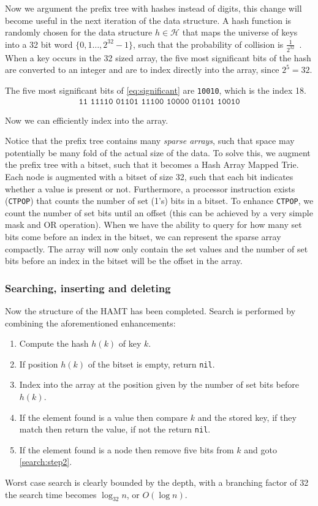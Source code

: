 Now we argument the prefix tree with hashes instead of digits, this change will become useful in the next iteration of the data structure.
A hash function is randomly chosen for the data structure $h \in \mathcal{H}$ that maps the universe of keys into a 32 bit word $\{0, 1 \dots , 2^{32} - 1\}$, such that the probability of collision is $\frac{1}{2^{32}}$~\cite{cormen2009introduction}.
When a key occurs in the 32 sized array, the five most significant bits of the hash are converted to an integer and are to index directly into the array, since $2^5 = 32$.
\begin{exmp}
  The five most significant bits of \autoref{eq:significant} are \texttt{10010}, which is the index 18.
  \begin{align}
    \texttt{11 11110 01101 11100 10000 01101 10010}\label{eq:significant}
  \end{align}
\end{exmp}
Now we can efficiently index into the array.

Notice that the prefix tree contains many \textit{sparse arrays}, such that space may potentially be many fold of the actual size of the data.
To solve this, we augment the prefix tree with a bitset, such that it becomes a Hash Array Mapped Trie.
Each node is augmented with a bitset of size 32, such that each bit indicates whether a value is present or not.
Furthermore, a processor instruction exists (\texttt{CTPOP}) that counts the number of set (1's) bits in a bitset.
To enhance \texttt{CTPOP}, we count the number of set bits until an offset (this can be achieved by a very simple mask and OR operation).
When we have the ability to query for how many set bits come before an index in the bitset, we can represent the sparse array compactly.
The array will now only contain the set values and the number of set bits before an index in the bitset will be the offset in the array.

\subsubsection{Searching, inserting and deleting}
Now the structure of the HAMT has been completed.
Search is performed by combining the aforementioned enhancements:
\begin{enumerate}
  \item Compute the hash $h(k)$ of key $k$.
  \item If position $h(k)$ of the bitset is empty, return \texttt{nil}.\label{search:step2}
  \item Index into the array at the position given by the number of set bits before $h(k)$.
  \item If the element found is a value then compare $k$ and the stored key, if they match then return the value, if not the return \texttt{nil}.
  \item If the element found is a node then remove five bits from $k$ and goto \autoref{search:step2}.
\end{enumerate}
Worst case search is clearly bounded by the depth, with a branching factor of 32 the search time becomes $\log_{32} n$, or $O(\log n)$.

